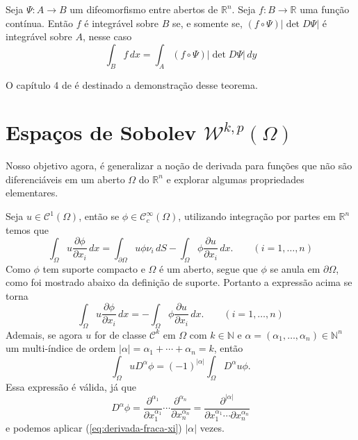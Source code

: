 \documentclass[a4paper, 11pt]{book}
\theoremstyle{definition}
\newcommand{\bN}{\mathbb{N}}
\newcommand{\bR}{\mathbb{R}}
\newcommand{\cC}{\mathcal{C}}
\newcommand{\cW}{\mathcal{W}}
\begin{document}
\begin{tbox}
    Seja $\Psi : A \to B$ um difeomorfismo entre abertos de $\bR^n$. Seja $f : B \to \bR$ uma função contínua. Então $f$ é integrável sobre $B$ se, e somente se, $(f \circ \Psi) |\det D\Psi|$ é integrável sobre $A$, nesse caso
    \[
        \int_B f \,dx = \int_A (f \circ \Psi) |\det D\Psi| \,dy
    \]
\end{tbox}
\begin{prf}
    O capítulo 4 de \cite{munkres-analysis.on.manifolds} é destinado a demonstração desse teorema.
\end{prf}

\section{Espaços de Sobolev $\cW^{k,p}(\Omega)$}


Nosso objetivo agora, é generalizar a noção de derivada para funções que não são diferenciáveis em um aberto $\Omega$ do $\bR^n$ e explorar algumas propriedades elementares.

Seja $u \in \cC^1(\Omega)$, então se $\phi \in \cC^\infty_c(\Omega)$, utilizando integração por partes em $\bR^n$ temos que
\[
    \int_\Omega u \dfrac{\partial \phi}{\partial x_i} \,dx = \int_{\partial\Omega} u\phi \nu_i \, dS- \int_\Omega \phi \dfrac{\partial u}{\partial x_i} \,dx. \qquad (i = 1,\dots,n)
\]
Como $\phi$ tem suporte compacto e $\Omega$ é um aberto, segue que $\phi$ se anula em $\partial\Omega$, como foi mostrado abaixo da definição de suporte. Portanto a expressão acima se torna
\begin{equation} \label{eq:derivada-fraca-xi}
    \int_\Omega u \dfrac{\partial \phi}{\partial x_i} \,dx = - \int_\Omega \phi \dfrac{\partial u}{\partial x_i} \,dx. \qquad (i = 1,\dots,n)
\end{equation}
Ademais, se agora $u$ for de classe $\cC^k$ em $\Omega$ com $k \in \bN$ e $\alpha = (\alpha_1,\dots,\alpha_n) \in \bN^n$ um multi-índice de ordem $|\alpha| = \alpha_1 + \cdots + \alpha_n = k$, então
\begin{equation} \label{eq:derivada-fraca-dalpha}
    \int_\Omega u D^\alpha \phi = (-1)^{|\alpha|} \int_\Omega D^\alpha u \phi.
\end{equation}
Essa expressão é válida, já que
\[
    D^\alpha \phi = \dfrac{\partial^{\alpha_1} }{\partial x_1^{\alpha_1}} \cdots \dfrac{\partial^{\alpha_n} }{\partial x_n^{\alpha_n}} = \dfrac{\partial^{|\alpha|} }{\partial x_1^{\alpha_1} \cdots \partial x_n^{\alpha_n}}
\]
e podemos aplicar (\ref{eq:derivada-fraca-xi}) $|\alpha|$ vezes.
\end{document}
